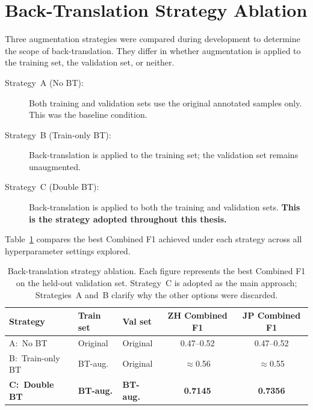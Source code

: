 \documentclass[../CLthesis.tex]{subfiles}
\begin{document}
\section{Back-Translation Strategy Ablation}
\label{sec:app-bt-ablation}

Three augmentation strategies were compared during development to determine the scope of back-translation. They differ in whether augmentation is applied to the training set, the validation set, or neither.

\begin{description}
  \item[Strategy~A (No BT):] Both training and validation sets use the original annotated samples only. This was the baseline condition.
  \item[Strategy~B (Train-only BT):] Back-translation is applied to the training set; the validation set remains unaugmented.
  \item[Strategy~C (Double BT):] Back-translation is applied to both the training and validation sets. \textbf{This is the strategy adopted throughout this thesis.}
\end{description}

Table~\ref{tab:bt-ablation} compares the best Combined F1 achieved under each strategy across all hyperparameter settings explored.

\begin{table}[htbp]
\centering
\small
\begin{tabular}{@{}p{3.2cm}llcc@{}}
\toprule
Strategy & Train set & Val set & ZH Combined F1 & JP Combined F1 \\
\midrule
A:~No BT               & Original  & Original  & 0.47--0.52     & 0.47--0.52 \\
B:~Train-only BT       & BT-aug.   & Original  & $\approx$0.56  & $\approx$0.55 \\
\textbf{C:~Double BT}  & \textbf{BT-aug.} & \textbf{BT-aug.} & \textbf{0.7145} & \textbf{0.7356} \\
\bottomrule
\end{tabular}
\caption{Back-translation strategy ablation. Each figure represents the best Combined F1 on the held-out validation set. Strategy~C is adopted as the main approach; Strategies~A and~B clarify why the other options were discarded.}
\label{tab:bt-ablation}
\end{table}
\end{document}
